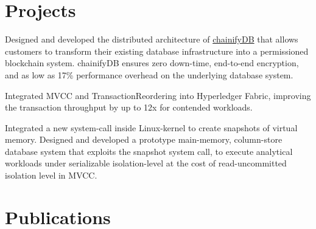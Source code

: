 \documentclass[]{deedy-resume-openfont}
\begin{document}
\begin{minipage}[t]{0.67\textwidth}

\section{Projects}
Designed and developed the distributed architecture of \href{www.chainifydb.com}{chainifyDB} that allows customers to transform their existing database infrastructure into a permissioned 
blockchain system. chainifyDB ensures zero down-time, end-to-end encryption, and as low as 17\% performance overhead on the underlying database system.

\sectionsep

Integrated MVCC and TransactionReordering into Hyperledger Fabric, improving the transaction throughput by up to 12x for contended workloads.
\sectionsep

Integrated a new system-call inside Linux-kernel to create snapshots of virtual memory. Designed and developed a prototype main-memory, column-store database system that exploits the snapshot system call, to execute analytical workloads under serializable isolation-level at the cost of read-uncommitted isolation level in MVCC.


\section{Publications} 
\vspace*{0.8cm}
\renewcommand\refname{\vskip -1.5cm} %


\nocite{*}


\end{minipage} 
\end{document}
